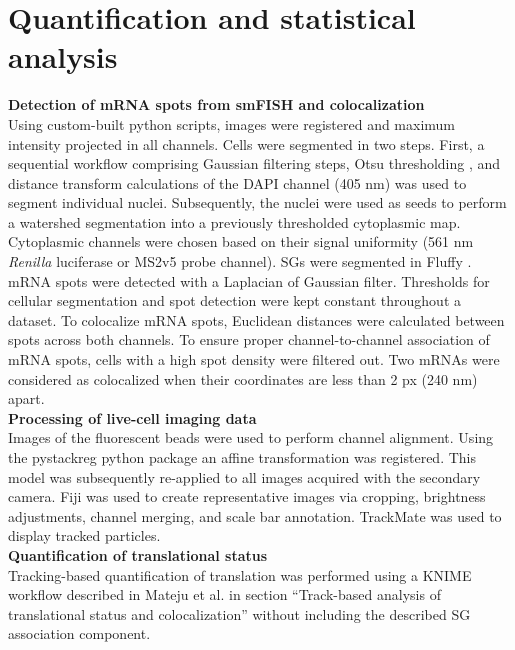 \section{Quantification and statistical analysis}

\textbf{Detection of mRNA spots from smFISH and colocalization} \\
Using custom-built python scripts, images were registered and maximum intensity projected in all channels.
Cells were segmented in two steps.
First, a sequential workflow comprising Gaussian filtering steps, Otsu thresholding \cite{otsu_threshold_1979}, and distance transform calculations of the DAPI channel (405 nm) was used to segment individual nuclei.
Subsequently, the nuclei were used as seeds to perform a watershed segmentation into a previously thresholded cytoplasmic map.
Cytoplasmic channels were chosen based on their signal uniformity (561 nm \textit{Renilla} luciferase or MS2v5 probe channel).
SGs were segmented in Fluffy \cite{eichenberger_fluffy_2020}.
mRNA spots were detected with a Laplacian of Gaussian filter.
Thresholds for cellular segmentation and spot detection were kept constant throughout a dataset.
To colocalize mRNA spots, Euclidean distances were calculated between spots across both channels.
To ensure proper channel-to-channel association of mRNA spots, cells with a high spot density were filtered out.
Two mRNAs were considered as colocalized when their coordinates are less than 2 px (240 nm) apart.
\\

\textbf{Processing of live-cell imaging data} \\
Images of the fluorescent beads were used to perform channel alignment.
Using the pystackreg python package \cite{thevenaz_pyramid_1998} an affine transformation was registered.
This model was subsequently re-applied to all images acquired with the secondary camera.
Fiji \cite{schindelin_fiji_2012} was used to create representative images via cropping, brightness adjustments, channel merging, and scale bar annotation.
TrackMate \cite{tinevez_trackmate:_2017} was used to display tracked particles.
\\

\textbf{Quantification of translational status} \\
Tracking-based quantification of translation was performed using a KNIME \cite{berthold_knime_2009} workflow described
    in Mateju et al. \cite{mateju_single-molecule_2020} in section “Track-based analysis of translational status and colocalization” without including the described SG association component.
\\

